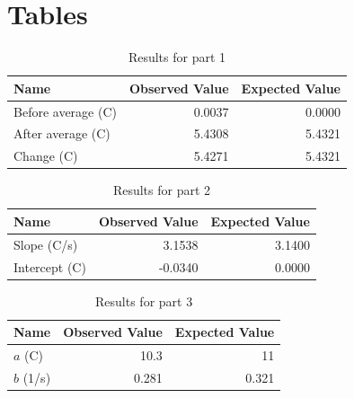 \section{Tables}
%
\begin{table}[ht]
    \centering
    \begin{tabular}{|l|r|r|}
        \hline
        Name & Observed Value & Expected Value \\
        \hline
        Before average (C) & 0.0037 & 0.0000 \\
        After average (C) & 5.4308 & 5.4321 \\
        Change (C) & 5.4271 & 5.4321 \\
        \hline
    \end{tabular}
    \caption{Results for part 1}
    \label{table_00_average}
\end{table}
%
\begin{table}[ht]
    \centering
    \begin{tabular}{|l|r|r|}
        \hline
        Name & Observed Value & Expected Value \\
        \hline
        Slope (C/s) & 3.1538 & 3.1400 \\
        Intercept (C) & -0.0340 & 0.0000 \\
        \hline
    \end{tabular}
    \caption{Results for part 2}
    \label{table_00_linear}
\end{table}
%
\begin{table}[ht]
    \centering
    \begin{tabular}{|l|r|r|}
        \hline
        Name & Observed Value & Expected Value \\
        \hline
        $a$ (C) & 10.3 & 11 \\
        $b$ (1/s) & 0.281 & 0.321 \\
        \hline
    \end{tabular}
    \caption{Results for part 3}
    \label{table_00_exponential}
\end{table}
%
\newpage
